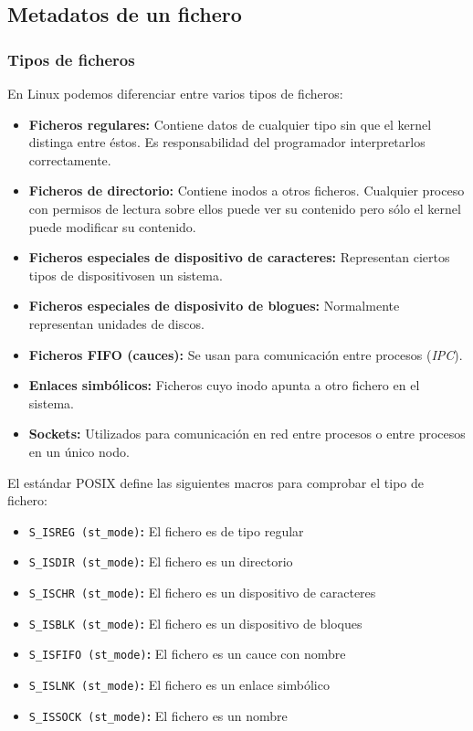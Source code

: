 \subsection{Metadatos de un fichero}

\subsubsection{Tipos de ficheros}

En Linux podemos diferenciar entre varios tipos de ficheros:

\begin{itemize}
	\item\textbf{Ficheros regulares:} Contiene datos de cualquier tipo sin que el kernel distinga entre éstos. Es responsabilidad del programador interpretarlos correctamente.
	\item\textbf{Ficheros de directorio:} Contiene inodos a otros ficheros. Cualquier proceso con permisos de lectura sobre ellos puede ver su contenido pero sólo el kernel puede modificar su contenido.
	\item\textbf{Ficheros especiales de dispositivo de caracteres:} Representan ciertos tipos de dispositivosen un sistema.
	\item\textbf{Ficheros especiales de disposivito de blogues:} Normalmente representan unidades de discos.
	\item\textbf{Ficheros FIFO (cauces):} Se usan para comunicación entre procesos (\emph{IPC}).
	\item\textbf{Enlaces simbólicos:} Ficheros cuyo inodo apunta a otro fichero en el sistema.
	\item\textbf{Sockets:} Utilizados para comunicación en red entre procesos o entre procesos en un único nodo.
\end{itemize}

El estándar POSIX define las siguientes macros para comprobar el tipo de fichero:

\begin{itemize}
	\item\texttt{S\_ISREG (st\_mode)}\textbf{:} El fichero es de tipo regular
	\item\texttt{S\_ISDIR (st\_mode)}\textbf{:} El fichero es un directorio
	\item\texttt{S\_ISCHR (st\_mode)}\textbf{:} El fichero es un dispositivo de caracteres
	\item\texttt{S\_ISBLK (st\_mode)}\textbf{:} El fichero es un dispositivo de bloques
	\item\texttt{S\_ISFIFO (st\_mode)}\textbf{:} El fichero es un cauce con nombre
	\item\texttt{S\_ISLNK (st\_mode)}\textbf{:} El fichero es un enlace simbólico
	\item\texttt{S\_ISSOCK (st\_mode)}\textbf{:} El fichero es un nombre
\end{itemize}

